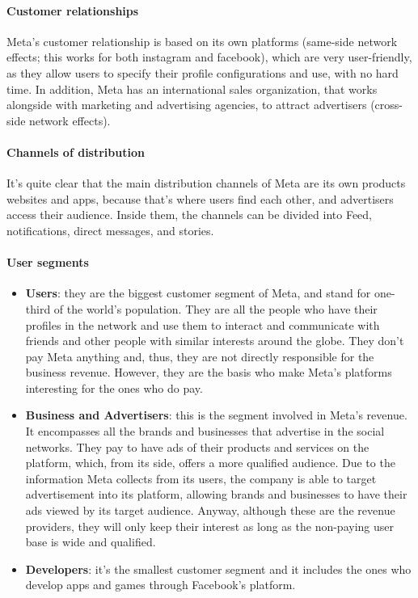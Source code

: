 \paragraph{Customer relationships}
Meta's customer relationship is based on its own platforms (same-side
network effects; this works for both instagram and facebook), which
are very user-friendly, as they allow users to specify their profile
configurations and use, with no hard time. In addition, Meta has an
international sales organization, that works alongside with marketing
and advertising agencies, to attract advertisers (cross-side network
effects).

\paragraph{Channels of distribution}
It's quite clear that the main distribution channels of Meta are its
own products websites and apps, because that's where users find each
other, and advertisers access their audience. Inside them, the
channels can be divided into Feed, notifications, direct messages, and
stories.

\paragraph{User segments}
\begin{itemize}
\item \textbf{Users}: they are the biggest customer segment of Meta,
  and stand for one-third of the world's population. They are all the
  people who have their profiles in the network and use them to
  interact and communicate with friends and other people with similar
  interests around the globe. They don't pay Meta anything and, thus,
  they are not directly responsible for the business revenue. However,
  they are the basis who make Meta's platforms interesting for the
  ones who do pay.

\item \textbf{Business and Advertisers}: this is the segment involved
  in Meta's revenue. It encompasses all the brands and businesses that
  advertise in the social networks. They pay to have ads of their
  products and services on the platform, which, from its side, offers
  a more qualified audience. Due to the information Meta collects from
  its users, the company is able to target advertisement into its
  platform, allowing brands and businesses to have their ads viewed by
  its target audience. Anyway, although these are the revenue
  providers, they will only keep their interest as long as the
  non-paying user base is wide and qualified.

\item \textbf{Developers}: it's the smallest customer segment and it
  includes the ones who develop apps and games through Facebook's
  platform.
\end{itemize}


